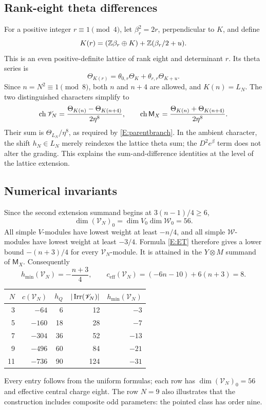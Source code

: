 \documentclass[11pt]{article}
\numberwithin{equation}{section}
\begin{document}
\subsection{Rank-eight theta differences}
For a positive integer $r\equiv1\pmod4$, let $\beta_r^2=2r$, perpendicular to $K$, and define
\[
K(r)=(\mathbb Z\beta_r\oplus K)+\mathbb Z(\beta_r/2+u).
\]
This is an even positive-definite lattice of rank eight and determinant $r$. Its theta series is
\begin{equation}\label{E:thetaKr}
\Theta_{K(r)}=\theta_{0,r}\Theta_K+\theta_{r,r}\Theta_{K+u}.
\end{equation}
Since $n=N^2\equiv1\pmod8$, both $n$ and $n+4$ are allowed, and $K(n)=L_N$. The two distinguished characters simplify to
\begin{equation}\label{E:thetadiff}
\operatorname{ch} \mathscr{V}_N=\frac{\Theta_{K(n)}-\Theta_{K(n+4)}}{2\eta^8},
\qquad
\operatorname{ch}\mathsf M_X=\frac{\Theta_{K(n)}+\Theta_{K(n+4)}}{2\eta^8}.
\end{equation}
Their sum is $\Theta_{L_N}/\eta^8$, as required by \eqref{E:parentbranch}. In the ambient character, the shift $h_N\in L_N$ merely reindexes the lattice theta sum; the $D^2e^\beta$ term does not alter the grading. This explains the sum-and-difference identities at the level of the lattice extension.

\subsection{Numerical invariants}\label{E:invariants}
Since the second extension summand begins at $3(n-1)/4\geq6$,
\[
\dim(\mathscr{V}_N)_0=\dim V_0\dim \mathcal W_0=56.
\]
All simple $V$-modules have lowest weight at least $-n/4$, and all simple $\mathcal W$-modules have lowest weight at least $-3/4$. Formula \eqref{E:ET} therefore gives a lower bound $-(n+3)/4$ for every $\mathscr{V}_N$-module. It is attained in the $Y\otimes M$ summand of $\mathsf M_X$. Consequently
\begin{equation}\label{E:ceff}
h_{\min}(\mathscr{V}_N)=-\frac{n+3}{4},\qquad
c_{\mathrm{eff}}(\mathscr{V}_N)=(-6n-10)+6(n+3)=8.
\end{equation}
\begin{center}
\begin{tabular}{rrrrr}
\toprule
$N$&$c(\mathscr{V}_N)$&$h_Q$&$|\operatorname{Irr}(\mathscr{V}_N)|$&$h_{\min}(\mathscr{V}_N)$\\
\midrule
3&$-64$&6&12&$-3$\\
5&$-160$&18&28&$-7$\\
7&$-304$&36&52&$-13$\\
9&$-496$&60&84&$-21$\\
11&$-736$&90&124&$-31$\\
\bottomrule
\end{tabular}
\end{center}
Every entry follows from the uniform formulas; each row has $\dim(\mathscr{V}_N)_0=56$ and effective central charge eight. The row $N=9$ also illustrates that the construction includes composite odd parameters: the pointed class has order nine.
\end{document}
